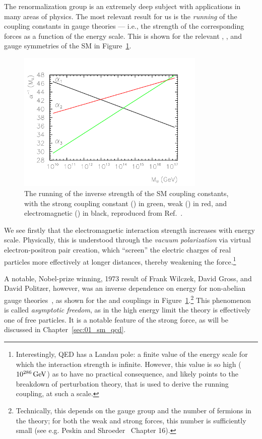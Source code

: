 The renormalization group is an extremely deep subject with applications in many areas of physics.
The most relevant result for us is the \textit{running} of the coupling constants in gauge theories --- i.e., the strength of the corresponding forces as a function of the energy scale.
This is shown for the relevant \UU[1], \SU[2], and \SU[3] gauge symmetries of the SM in Figure~\ref{fig:01_qft_running}.

\begin{figure}[ht]
	\centering
	\includegraphics[width=0.8\textwidth]{figures/01-SM-03-SM/qcd/Running-couplings-in-the-standard-model.png}
	\caption{The running of the inverse strength of the SM coupling constants, with the strong coupling constant (\SU[3]) in green, weak (\SU[2]) in red, and electromagnetic (\UU[1]) in black, reproduced from Ref.~\cite{Dias2004}.}
	\label{fig:01_qft_running}
\end{figure}

We see firstly that the electromagnetic interaction strength increases with energy scale.
Physically, this is understood through the \textit{vacuum polarization} via virtual electron-positron pair creation, which ``screen'' the electric charges of real particles more effectively at longer distances, thereby weakening the force.\footnote{Interestingly, QED has a Landau pole: a finite value of the energy scale for which the interaction strength is infinite. However, this value is so high ($10^{286} \,\text{Ge\hspace{-.08em}V}$) as to have no practical consequence, and likely points to the breakdown of perturbation theory, that is used to derive the running coupling, at such a scale.}

A notable, Nobel-prize winning, 1973 result of Frank Wilczek, David Gross, and David Politzer, however, was an inverse dependence on energy for non-abelian gauge theories~\cite{Politzer:1973fx, Gross:1973id}, as shown for the \SU[2] and \SU[3] couplings in Figure~\ref{fig:01_qft_running}.\footnote{Technically, this depends on the gauge group and the number of fermions in the theory; for both the weak and strong forces, this number is sufficiently small (see e.g. Peskin and Shroeder~\cite{Peskin:1995ev} Chapter 16).}
This phenomenon is called \textit{asymptotic freedom}, as in the high energy limit the theory is effectively one of free particles.
It is a notable feature of the strong force, as will be discussed in Chapter~\ref{sec:01_sm_qcd}.


